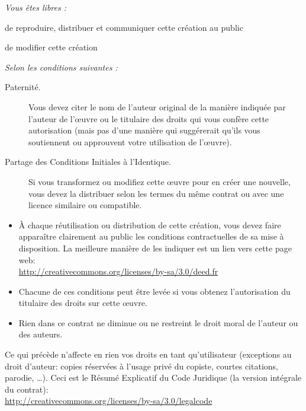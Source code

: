 \documentclass[a4paper,10pt,twoside]{book}
\begin{document}
\begin{footnotesize}
\emph{Vous \^etes libres :}
\begin{description}
  \item de reproduire, distribuer et communiquer cette cr\'eation au public
  \item de modifier cette cr\'eation
\end{description}
\emph{Selon les conditions suivantes :}
\begin{description}
  \item[Paternit\'e.] Vous devez citer le nom de l'auteur original de la mani\`ere indiqu\'ee par l'auteur de l'\oe{}uvre ou le titulaire des droits qui vous conf\`ere cette autorisation (mais pas d'une mani\`ere qui sugg\'ererait qu'ils vous soutiennent ou approuvent votre utilisation de l'\oe{}uvre).
  \item[Partage des Conditions Initiales \`a l'Identique.] Si vous transformez ou modifiez cette \oe{}uvre pour en cr\'eer une nouvelle, vous devez la distribuer selon les termes du m\^eme contrat ou avec une licence similaire ou compatible.
\end{description}
\begin{itemize}
  \item \`A chaque r\'eutilisation ou distribution de cette cr\'eation, vous devez faire appara\^itre clairement au public les conditions contractuelles de sa mise \`a disposition. La meilleure mani\`ere de les indiquer est un lien vers cette page web:\\
  \url{http://creativecommons.org/licenses/by-sa/3.0/deed.fr}
  \item Chacune de ces conditions peut \^etre lev\'ee si vous obtenez l'autorisation du titulaire des droits sur cette \oe{}uvre.
  \item Rien dans ce contrat ne diminue ou ne restreint le droit moral de l'auteur ou des auteurs.
\end{itemize}
\quad
\parbox{\textwidth-2cm-1em}{
	Ce qui pr\'ec\`ede n'affecte en rien vos droits en tant qu'utilisateur (exceptions au droit d'auteur: copies r\'eserv\'ees \`a l'usage priv\'e du copiste, courtes citations, parodie, \ldots).
	Ceci est le R\'esum\'e Explicatif du Code Juridique (la version int\'egrale du contrat):\\
\url{http://creativecommons.org/licenses/by-sa/3.0/legalcode}}
\end{footnotesize}
\vfill
\tableofcontents
\sloppy %

\mainmatter
\end{document}
